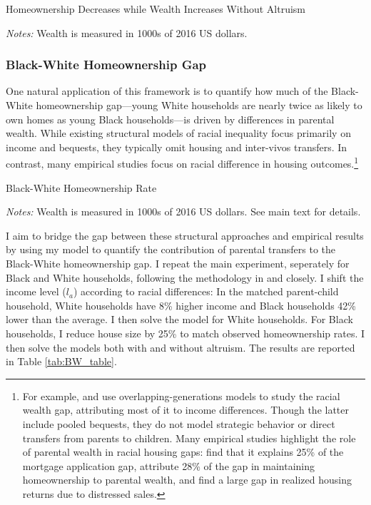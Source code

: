 \documentclass[12pt]{article}
\begin{document}
\begin{table}[tb]
	\center 
	\begin{threeparttable}
		\caption{Homeownership Decreases while Wealth Increases Without Altruism}\label{tab:modelfitnoa}
		
		\footnotesize
		\textit{Notes:} Wealth is measured in 1000s of 2016 US dollars.
	\end{threeparttable}
\end{table}

\subsubsection{Black-White Homeownership Gap}\label{sec:bwgap}
One natural application of this framework is to quantify how much of the Black-White homeownership gap---young White households are nearly twice as likely to own homes as young Black households---is driven by differences in parental wealth. While existing structural models of racial inequality focus primarily on income and bequests, they typically omit housing and inter-vivos transfers. In contrast, many empirical studies focus on racial difference in housing outcomes.\footnote{For example, \citet{Ashman2020} and \citet{aliprantis2022dynamics} use overlapping-generations models to study the racial wealth gap, attributing most of it to income differences. Though the latter include pooled bequests, they do not model strategic behavior or direct transfers from parents to children. Many empirical studies highlight the role of parental wealth in racial housing gaps: \citet{charles2002transition} find that it explains 25\% of the mortgage application gap,  \citet{bond2021role} attribute 28\% of the gap in maintaining homeownership to parental wealth, and \cite{kermani2021racial} find a large gap in realized housing returns due to distressed sales.}

\begin{table}
	\center
\begin{threeparttable}[tb]
				\singlespacing
		\caption{Black-White Homeownership Rate}\label{tab:BW_table}
		
		\footnotesize
		\textit{Notes:} Wealth is measured in 1000s of 2016 US dollars. See main text for details.
	\end{threeparttable}
\end{table}


I aim to bridge the gap between these structural approaches and empirical results by using my model to quantify the contribution of parental transfers to the Black-White homeownership gap. I repeat the main experiment, seperately for Black and White households, following the methodology in \cite{Ashman2020} and \cite{aliprantis2022dynamics} closely. I shift the income level ($l_a$) according to racial differences: In the matched parent-child household, White households have 8\% higher income and Black households 42\% lower than the average. I then solve the model for White households. For Black households, I reduce house size by 25\% to match observed homeownership rates. I then solve the models both with and without altruism. The results are reported in Table \ref{tab:BW_table}. 
\end{document}
